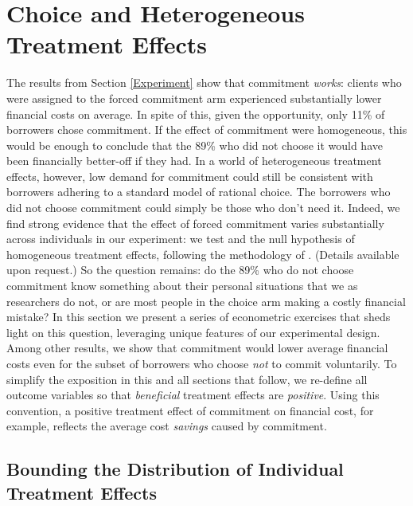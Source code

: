 \documentclass[12pt, a4paper]{article}
\begin{document}
\section{Choice and Heterogeneous Treatment Effects}
\label{Choice}

The results from Section \ref{Experiment} show that commitment \emph{works}: clients who were assigned to the forced commitment arm experienced substantially lower financial costs on average.
In spite of this, given the opportunity, only 11\% of borrowers chose commitment. 
If the effect of commitment were homogeneous, this would be enough to conclude that the 89\% who did not choose it would have been financially better-off if they had.
In a world of heterogeneous treatment effects, however, low demand for commitment could still be consistent with borrowers adhering to a standard model of rational choice. 
The borrowers who did not choose commitment could simply be those who don't need it. 
Indeed, we find strong evidence that the effect of forced commitment varies substantially across individuals in our experiment: we test and
the null hypothesis of homogeneous treatment effects, following the methodology of \cite{chernozhukov2018generic}. (Details available upon request.)
So the question remains: do the 89\% who do not choose commitment know something about their personal situations that we as researchers do not, or are most people in the choice arm making a costly financial mistake? 
In this section we present a series of econometric exercises that sheds light on this question, leveraging unique features of our experimental design. 
Among other results, we show that commitment would lower average financial costs even for the subset of borrowers who choose \emph{not} to commit voluntarily.
To simplify the exposition in this and all sections that follow, we re-define all outcome variables so that \emph{beneficial} treatment effects are \emph{positive}. Using this convention, a positive treatment effect of commitment on financial cost, for example, reflects the average cost \emph{savings} caused by commitment.

\subsection{Bounding the Distribution of Individual Treatment Effects}
\label{sec:bounds}
\end{document}
